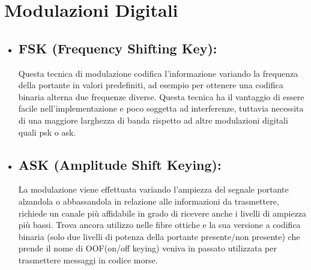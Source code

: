 \section{Modulazioni Digitali}
\label{sec:context}
\begin{itemize}
  \item \subsection{FSK (Frequency Shifting Key): } Questa tecnica di modulazione codifica l'informazione variando la frequenza della portante in valori predefiniti, ad esempio per ottenere una codifica binaria alterna due frequenze diverse. Questa tecnica ha il vantaggio di essere facile nell'implementazione e poco soggetta ad interferenze, tuttavia necessita di una maggiore larghezza di banda rispetto ad altre modulazioni digitali quali psk o ask.
  \cite{fsk}
  \item \subsection{ASK (Amplitude Shift Keying): } La modulazione viene effettuata variando l'ampiezza del segnale portante alzandola o abbassandola in relazione alle informazioni da trasmettere, richiede un canale più affidabile in grado di ricevere anche i livelli di ampiezza più bassi. Trova ancora utilizzo nelle fibre ottiche e la sua versione a codifica binaria (solo due livelli di potenza della portante presente/non presente) che prende il nome di OOF(on/off keying) veniva in passato utilizzata per trasmettere messaggi in codice morse.
  \cite{ask}
  

\end{itemize}
